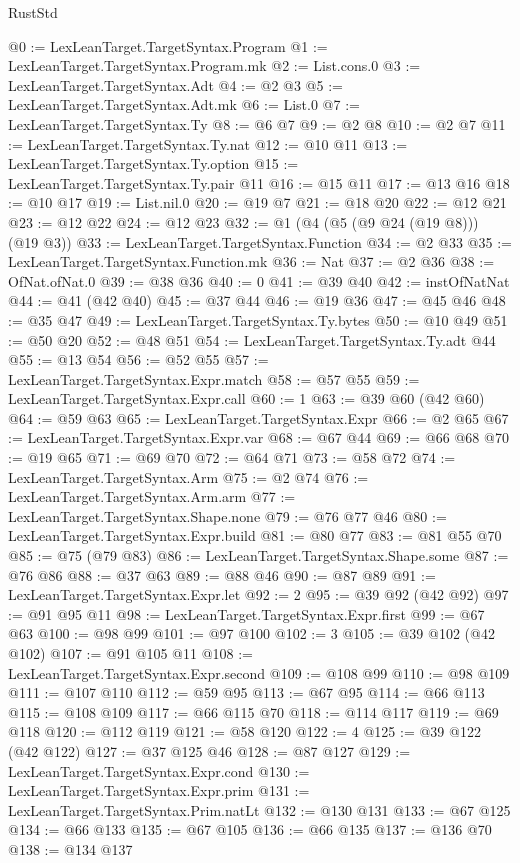 \begin{lexlean}{RustStd}
\begin{coremodule}
{\begin{coremodule}
{{{{{{{{{{{{{{{{{{{{{{{{{{{{{{{{{{{{{{{{{{{@0 := LexLeanTarget.TargetSyntax.Program
@1 := LexLeanTarget.TargetSyntax.Program.mk
@2 := List.cons.{0}
@3 := LexLeanTarget.TargetSyntax.Adt
@4 := @2 @3
@5 := LexLeanTarget.TargetSyntax.Adt.mk
@6 := List.{0}
@7 := LexLeanTarget.TargetSyntax.Ty
@8 := @6 @7
@9 := @2 @8
@10 := @2 @7
@11 := LexLeanTarget.TargetSyntax.Ty.nat
@12 := @10 @11
@13 := LexLeanTarget.TargetSyntax.Ty.option
@15 := LexLeanTarget.TargetSyntax.Ty.pair @11
@16 := @15 @11
@17 := @13 @16
@18 := @10 @17
@19 := List.nil.{0}
@20 := @19 @7
@21 := @18 @20
@22 := @12 @21
@23 := @12 @22
@24 := @12 @23
@32 := @1 (@4 (@5 (@9 @24 (@19 @8))) (@19 @3))
@33 := LexLeanTarget.TargetSyntax.Function
@34 := @2 @33
@35 := LexLeanTarget.TargetSyntax.Function.mk
@36 := Nat
@37 := @2 @36
@38 := OfNat.ofNat.{0}
@39 := @38 @36
@40 := 0
@41 := @39 @40
@42 := instOfNatNat
@44 := @41 (@42 @40)
@45 := @37 @44
@46 := @19 @36
@47 := @45 @46
@48 := @35 @47
@49 := LexLeanTarget.TargetSyntax.Ty.bytes
@50 := @10 @49
@51 := @50 @20
@52 := @48 @51
@54 := LexLeanTarget.TargetSyntax.Ty.adt @44
@55 := @13 @54
@56 := @52 @55
@57 := LexLeanTarget.TargetSyntax.Expr.match
@58 := @57 @55
@59 := LexLeanTarget.TargetSyntax.Expr.call
@60 := 1
@63 := @39 @60 (@42 @60)
@64 := @59 @63
@65 := LexLeanTarget.TargetSyntax.Expr
@66 := @2 @65
@67 := LexLeanTarget.TargetSyntax.Expr.var
@68 := @67 @44
@69 := @66 @68
@70 := @19 @65
@71 := @69 @70
@72 := @64 @71
@73 := @58 @72
@74 := LexLeanTarget.TargetSyntax.Arm
@75 := @2 @74
@76 := LexLeanTarget.TargetSyntax.Arm.arm
@77 := LexLeanTarget.TargetSyntax.Shape.none
@79 := @76 @77 @46
@80 := LexLeanTarget.TargetSyntax.Expr.build
@81 := @80 @77
@83 := @81 @55 @70
@85 := @75 (@79 @83)
@86 := LexLeanTarget.TargetSyntax.Shape.some
@87 := @76 @86
@88 := @37 @63
@89 := @88 @46
@90 := @87 @89
@91 := LexLeanTarget.TargetSyntax.Expr.let
@92 := 2
@95 := @39 @92 (@42 @92)
@97 := @91 @95 @11
@98 := LexLeanTarget.TargetSyntax.Expr.first
@99 := @67 @63
@100 := @98 @99
@101 := @97 @100
@102 := 3
@105 := @39 @102 (@42 @102)
@107 := @91 @105 @11
@108 := LexLeanTarget.TargetSyntax.Expr.second
@109 := @108 @99
@110 := @98 @109
@111 := @107 @110
@112 := @59 @95
@113 := @67 @95
@114 := @66 @113
@115 := @108 @109
@117 := @66 @115 @70
@118 := @114 @117
@119 := @69 @118
@120 := @112 @119
@121 := @58 @120
@122 := 4
@125 := @39 @122 (@42 @122)
@127 := @37 @125 @46
@128 := @87 @127
@129 := LexLeanTarget.TargetSyntax.Expr.cond
@130 := LexLeanTarget.TargetSyntax.Expr.prim
@131 := LexLeanTarget.TargetSyntax.Prim.natLt
@132 := @130 @131
@133 := @67 @125
@134 := @66 @133
@135 := @67 @105
@136 := @66 @135
@137 := @136 @70
@138 := @134 @137
}}}}}}}}}}}}}}}}}}}}}}}}}}}}}}}}}}}}}}}}}}}
\end{coremodule}}
\end{coremodule}
\end{lexlean}
